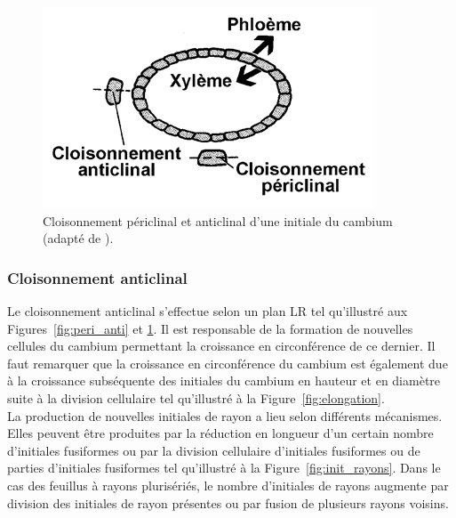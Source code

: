 \begin{figure}[h]
\centering
\includegraphics[scale=0.5]{img/ch5_peri_anti_haut}
\caption{Cloisonnement périclinal et anticlinal d'une initiale du cambium (adapté de \cite{bowyer2007forest}).}
\label{fig:peri_anti_haut}
\end{figure}

\subsubsection{Cloisonnement anticlinal}

Le cloisonnement anticlinal s'effectue selon un plan LR tel qu'illustré aux Figures~\ref{fig:peri_anti} et \ref{fig:peri_anti_haut}. Il est responsable de la formation de nouvelles cellules du cambium permettant la croissance en circonférence de ce dernier. Il faut remarquer que la croissance en circonférence du cambium est également due à la croissance subséquente des initiales du cambium en hauteur et en diamètre suite à la division cellulaire tel qu'illustré à la Figure~\ref{fig:elongation}.\\

La production de nouvelles initiales de rayon a lieu selon différents mécanismes.  Elles peuvent être produites par la réduction en longueur d'un certain nombre d'initiales fusiformes ou par la division cellulaire d'initiales fusiformes ou de parties d'initiales fusiformes tel qu'illustré à la Figure~\ref{fig:init_rayons}. Dans le cas des feuillus à rayons plurisériés, le nombre d'initiales de rayons augmente par division des initiales de rayon présentes ou par fusion de plusieurs rayons voisins.\\

